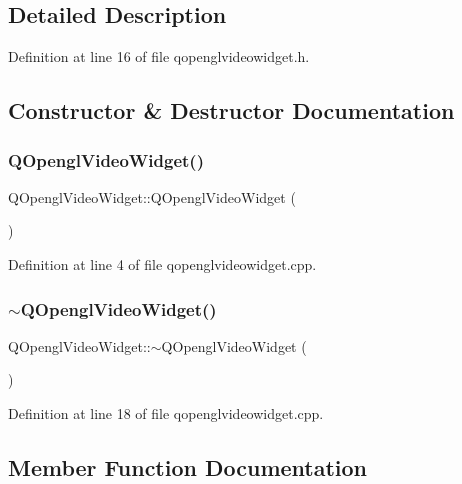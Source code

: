 \subsection{Detailed Description}


Definition at line 16 of file qopenglvideowidget.\+h.



\subsection{Constructor \& Destructor Documentation}
\mbox{\label{class_q_opengl_video_widget_a55029786e1e6efafddc48743b37553e3}} 
\subsubsection{\texorpdfstring{QOpenglVideoWidget()}{QOpenglVideoWidget()}}
{\footnotesize\ttfamily Q\+Opengl\+Video\+Widget\+::\+Q\+Opengl\+Video\+Widget (\begin{DoxyParamCaption}{ }\end{DoxyParamCaption})}



Definition at line 4 of file qopenglvideowidget.\+cpp.

\mbox{\label{class_q_opengl_video_widget_a6ad850569c0b4dc54d73de589ace82e9}} 
\subsubsection{\texorpdfstring{$\sim$QOpenglVideoWidget()}{~QOpenglVideoWidget()}}
{\footnotesize\ttfamily Q\+Opengl\+Video\+Widget\+::$\sim$\+Q\+Opengl\+Video\+Widget (\begin{DoxyParamCaption}{ }\end{DoxyParamCaption})}



Definition at line 18 of file qopenglvideowidget.\+cpp.



\subsection{Member Function Documentation}
\mbox{\label{class_q_opengl_video_widget_ab67a75026cc3213c618b7d25227f179c}} 
